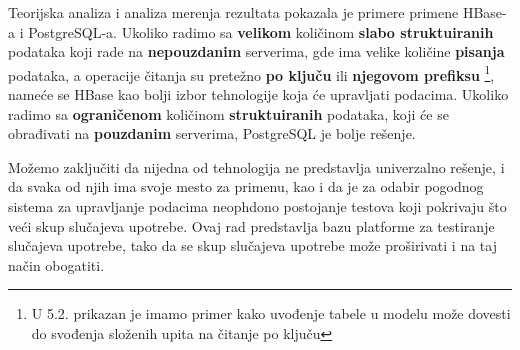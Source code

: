 \documentclass[12pt,oneside]{memoir}
\begin{document}
Teorijska analiza i analiza merenja rezultata pokazala je primere primene HBase-a i PostgreSQL-a. Ukoliko radimo sa \textbf{velikom} količinom \textbf{slabo struktuiranih} podataka koji rade na \textbf{nepouzdanim} serverima, gde ima velike količine \textbf{pisanja} podataka, a operacije čitanja su pretežno \textbf{po ključu} ili \textbf{njegovom prefiksu} \footnote{U 5.2. prikazan je imamo primer kako uvođenje tabele u modelu može dovesti do svođenja složenih upita na čitanje po ključu}, nameće se HBase kao bolji izbor tehnologije koja će upravljati podacima. Ukoliko radimo sa \textbf{ograničenom} količinom \textbf{struktuiranih} podataka, koji će se obrađivati na \textbf{pouzdanim} serverima, PostgreSQL je bolje rešenje.

Možemo zaključiti da nijedna od tehnologija ne predstavlja univerzalno rešenje, i da svaka od njih ima svoje mesto za primenu, kao i da je za odabir pogodnog sistema za upravljanje podacima neophdono postojanje testova koji pokrivaju što veći skup slučajeva upotrebe. Ovaj rad predstavlja bazu platforme za testiranje slučajeva upotrebe, tako da se skup slučajeva upotrebe može proširivati i na taj način obogatiti.



\literatura

\backmatter

\end{document}
